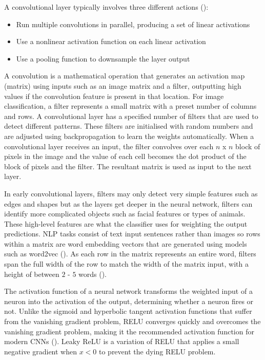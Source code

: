 A convolutional layer typically involves three different actions (\cite{goodfellow_deep_learning_2016}):
\begin{itemize}
    \item Run multiple convolutions in parallel, producing a set of linear activations
    \item Use a nonlinear activation function on each linear activation
    \item Use a pooling function to downsample the layer output
\end{itemize}


A convolution is a mathematical operation that generates an activation map (matrix) using inputs such as an image matrix and a filter, outputting high values if the convolution feature is present in that location. For image classification, a filter represents a small matrix with a preset number of columns and rows.
A convolutional layer has a specified number of filters that are used to detect different patterns. These filters are initialised with random numbers and are adjusted using backpropagation to learn the weights automatically.
When a convolutional layer receives an input, the filter convolves over each $n$ x $n$ block of pixels in the image and the value of each cell becomes the dot product of the block of pixels and the filter. The resultant matrix is used as input to the next layer.

In early convolutional layers, filters may only detect very simple features such as edges and shapes but as the layers get deeper in the neural network, filters can identify more complicated objects such as facial features or types of animals. These high-level features are what the classifier uses for weighting the output predictions.
\acrshort{NLP} tasks consist of text input sentences rather than images so rows within a matrix are word embedding vectors that are generated using models such as word2vec (\cite{mikolov_word2vec_2013}). 
As each row in the matrix represents an entire word, filters span the full width of the row to match the width of the matrix input, with a height of between $2$ - $5$ words (\cite{lopez_deep_2017}).

The activation function of a neural network transforms the weighted input of a neuron into the activation of the output, determining whether a neuron fires or not. Unlike the sigmoid and hyperbolic tangent activation functions that suffer from the vanishing gradient problem, \acrfull{RELU} converges quickly and overcomes the vanishing gradient problem, making it the recommended activation function for modern \acrshort{CNN}s (\cite{nair_rectified_2010}). 
Leaky ReLU is a variation of \acrshort{RELU} that applies a small negative gradient when $x < 0$ to prevent the dying \acrshort{RELU} problem.

